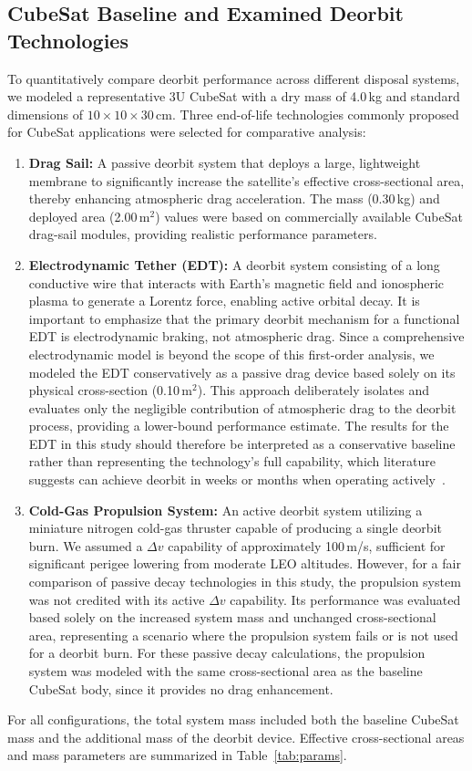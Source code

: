 \documentclass[11pt,a4paper]{article}
\begin{document}
\subsection{CubeSat Baseline and Examined Deorbit Technologies}
To quantitatively compare deorbit performance across different disposal systems, we modeled a representative 3U CubeSat with a dry mass of 4.0\,kg and standard dimensions of $10\times10\times30$\,cm. Three end-of-life technologies commonly proposed for CubeSat applications were selected for comparative analysis:

\begin{enumerate}
\item \textbf{Drag Sail:} A passive deorbit system that deploys a large, lightweight membrane to significantly increase the satellite's effective cross-sectional area, thereby enhancing atmospheric drag acceleration. The mass (0.30\,kg) and deployed area (2.00\,m$^2$) values were based on commercially available CubeSat drag-sail modules, providing realistic performance parameters.
\item \textbf{Electrodynamic Tether (EDT):} A deorbit system consisting of a long conductive wire that interacts with Earth's magnetic field and ionospheric plasma to generate a Lorentz force, enabling active orbital decay. It is important to emphasize that the primary deorbit mechanism for a functional EDT is electrodynamic braking, not atmospheric drag. Since a comprehensive electrodynamic model is beyond the scope of this first-order analysis, we modeled the EDT conservatively as a passive drag device based solely on its physical cross-section (0.10\,m$^2$). This approach deliberately isolates and evaluates only the negligible contribution of atmospheric drag to the deorbit process, providing a lower-bound performance estimate. The results for the EDT in this study should therefore be interpreted as a conservative baseline rather than representing the technology's full capability, which literature suggests can achieve deorbit in weeks or months when operating actively~\cite{bilen,sarego,nasa2021}.
\item \textbf{Cold-Gas Propulsion System:} An active deorbit system utilizing a miniature nitrogen cold-gas thruster capable of producing a single deorbit burn. We assumed a $\Delta v$ capability of approximately 100\,m/s, sufficient for significant perigee lowering from moderate LEO altitudes. However, for a fair comparison of passive decay technologies in this study, the propulsion system was not credited with its active $\Delta v$ capability. Its performance was evaluated based solely on the increased system mass and unchanged cross-sectional area, representing a scenario where the propulsion system fails or is not used for a deorbit burn. For these passive decay calculations, the propulsion system was modeled with the same cross-sectional area as the baseline CubeSat body, since it provides no drag enhancement.
\end{enumerate}
For all configurations, the total system mass included both the baseline CubeSat mass and the additional mass of the deorbit device. Effective cross-sectional areas and mass parameters are summarized in Table~\ref{tab:params}.
\end{document}
